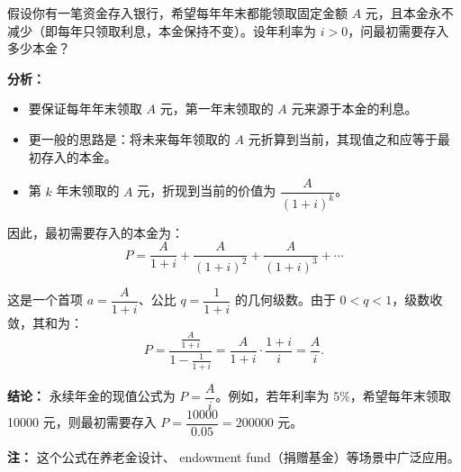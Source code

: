\documentclass[fontset=fandol]{ctexart}
\begin{document}
\begin{application}

假设你有一笔资金存入银行，希望每年年末都能领取固定金额 \(A\) 元，且本金永不减少（即每年只领取利息，本金保持不变）。设年利率为 \(i>0\)，问最初需要存入多少本金？

\textbf{分析：}
\begin{itemize}
\item 要保证每年年末领取 \(A\) 元，第一年末领取的 \(A\) 元来源于本金的利息。
\item 更一般的思路是：将未来每年领取的 \(A\) 元折算到当前，其现值之和应等于最初存入的本金。
\item 第 \(k\) 年末领取的 \(A\) 元，折现到当前的价值为 \(\dfrac{A}{(1+i)^k}\)。
\end{itemize}

因此，最初需要存入的本金为：
\[
P = \frac{A}{1+i} + \frac{A}{(1+i)^2} + \frac{A}{(1+i)^3} + \cdots
\]

这是一个首项 \(a=\dfrac{A}{1+i}\)、公比 \(q=\dfrac{1}{1+i}\) 的几何级数。由于 \(0<q<1\)，级数收敛，其和为：
\[
P=\frac{\frac{A}{1+i}}{1-\frac{1}{1+i}}
=\frac{A}{1+i}\cdot\frac{1+i}{i}
=\frac{A}{i}.
\]

\textbf{结论：} 永续年金的现值公式为 \(P=\dfrac{A}{i}\)。例如，若年利率为 \(5\%\)，希望每年末领取 10000 元，则最初需要存入 \(P=\dfrac{10000}{0.05}=200000\) 元。

\textbf{注：} 这个公式在养老金设计、 endowment fund（捐赠基金）等场景中广泛应用。
\end{application}
\end{document}
